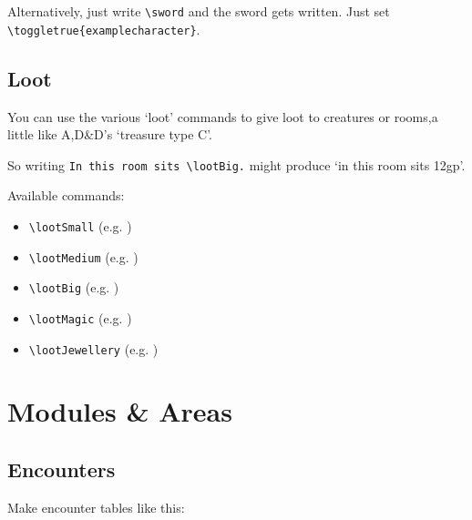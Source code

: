\documentclass[a4paper,openany]{book}
\begin{document}
\begin{multicols}{2}
Alternatively, just write \verb"\sword" and the sword gets written.
Just set \verb"\toggletrue{examplecharacter}".

\subsection{Loot}

You can use the various `loot' commands to give loot to creatures or rooms,a little like A,D\&D's `treasure type C'.

So writing \verb"In this room sits \lootBig." might produce `in this room sits 12gp'.

Available commands:

\begin{itemize}

  \item
  \verb"\lootSmall" (e.g. \lootSmall)
  \item
  \verb"\lootMedium" (e.g. \lootMedium)
  \item
  \verb"\lootBig" (e.g. \lootBig)
  \item
  \verb"\lootMagic" (e.g. \lootMagic)
  \item
  \verb"\lootJewellery" (e.g. \lootJewellery)

\end{itemize}

\end{multicols}

\section{Modules \& Areas}

\subsection{Encounters}

Make encounter tables like this:
\end{document}
